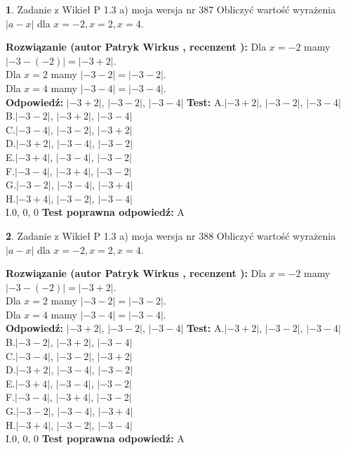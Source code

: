 \documentclass[12pt, a4paper]{article}
\theoremstyle{definition} %
\newtheorem{zad}{}
\newcommand{\zadStart}[1]{\begin{zad}#1\newline}
\newcommand{\zadStop}{\end{zad}}
\newcommand{\rozwStart}[2]{\noindent \textbf{Rozwiązanie (autor #1 , recenzent #2): }\newline}
\newcommand{\rozwStop}{\newline}
\newcommand{\odpStart}{\noindent \textbf{Odpowiedź:}\newline}
\newcommand{\odpStop}{\newline}
\newcommand{\testStart}{\noindent \textbf{Test:}\newline}
\newcommand{\testStop}{\newline}
\newcommand{\kluczStart}{\noindent \textbf{Test poprawna odpowiedź:}\newline}
\newcommand{\kluczStop}{\newline}
\begin{document}
\zadStart{Zadanie z Wikieł P 1.3 a) moja wersja nr 387}
Obliczyć wartość wyrażenia $|a - x|$ dla $x=-2,x=2,x=4$.
\zadStop
\rozwStart{Patryk Wirkus}{}
Dla $x = -2$ mamy $|-3 - (-2)| = |-3 + 2|$.\\
Dla $x = 2$ mamy $|-3 - 2| = |-3 - 2|$.\\
Dla $x = 4$ mamy $|-3 - 4| = |-3 - 4|$.\\
\rozwStop
\odpStart
$|-3 + 2|$, $|-3 - 2|$, $|-3 - 4|$
\odpStop
\testStart
A.$|-3 + 2|$, $|-3 - 2|$, $|-3 - 4|$\\
B.$|-3 - 2|$, $|-3 + 2|$, $|-3 - 4|$\\
C.$|-3 - 4|$, $|-3 - 2|$, $|-3 + 2|$\\
D.$|-3 + 2|$, $|-3 - 4|$, $|-3 - 2|$\\
E.$|-3 + 4|$, $|-3 - 4|$, $|-3 - 2|$\\
F.$|-3 - 4|$, $|-3 + 4|$, $|-3 - 2|$\\
G.$|-3 - 2|$, $|-3 - 4|$, $|-3 + 4|$\\
H.$|-3 + 4|$, $|-3 - 2|$, $|-3 - 4|$\\
I.$0$, $0$, $0$
\testStop
\kluczStart
A
\kluczStop



\zadStart{Zadanie z Wikieł P 1.3 a) moja wersja nr 388}
Obliczyć wartość wyrażenia $|a - x|$ dla $x=-2,x=2,x=4$.
\zadStop
\rozwStart{Patryk Wirkus}{}
Dla $x = -2$ mamy $|-3 - (-2)| = |-3 + 2|$.\\
Dla $x = 2$ mamy $|-3 - 2| = |-3 - 2|$.\\
Dla $x = 4$ mamy $|-3 - 4| = |-3 - 4|$.\\
\rozwStop
\odpStart
$|-3 + 2|$, $|-3 - 2|$, $|-3 - 4|$
\odpStop
\testStart
A.$|-3 + 2|$, $|-3 - 2|$, $|-3 - 4|$\\
B.$|-3 - 2|$, $|-3 + 2|$, $|-3 - 4|$\\
C.$|-3 - 4|$, $|-3 - 2|$, $|-3 + 2|$\\
D.$|-3 + 2|$, $|-3 - 4|$, $|-3 - 2|$\\
E.$|-3 + 4|$, $|-3 - 4|$, $|-3 - 2|$\\
F.$|-3 - 4|$, $|-3 + 4|$, $|-3 - 2|$\\
G.$|-3 - 2|$, $|-3 - 4|$, $|-3 + 4|$\\
H.$|-3 + 4|$, $|-3 - 2|$, $|-3 - 4|$\\
I.$0$, $0$, $0$
\testStop
\kluczStart
A
\kluczStop
\end{document}
